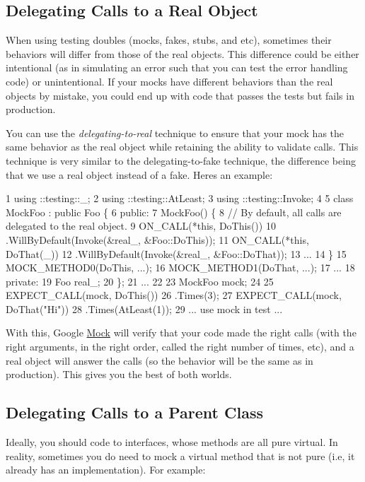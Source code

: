 \subsection*{Delegating Calls to a Real Object}

When using testing doubles (mocks, fakes, stubs, and etc), sometimes their behaviors will differ from those of the real objects. This difference could be either intentional (as in simulating an error such that you can test the error handling code) or unintentional. If your mocks have different behaviors than the real objects by mistake, you could end up with code that passes the tests but fails in production.

You can use the {\itshape delegating-\/to-\/real} technique to ensure that your mock has the same behavior as the real object while retaining the ability to validate calls. This technique is very similar to the delegating-\/to-\/fake technique, the difference being that we use a real object instead of a fake. Here\textquotesingle{}s an example\+:


\begin{DoxyCode}
1 using ::testing::\_;
2 using ::testing::AtLeast;
3 using ::testing::Invoke;
4 
5 class MockFoo : public Foo \{
6  public:
7   MockFoo() \{
8     // By default, all calls are delegated to the real object.
9     ON\_CALL(*this, DoThis())
10         .WillByDefault(Invoke(&real\_, &Foo::DoThis));
11     ON\_CALL(*this, DoThat(\_))
12         .WillByDefault(Invoke(&real\_, &Foo::DoThat));
13     ...
14   \}
15   MOCK\_METHOD0(DoThis, ...);
16   MOCK\_METHOD1(DoThat, ...);
17   ...
18  private:
19   Foo real\_;
20 \};
21 ...
22 
23   MockFoo mock;
24 
25   EXPECT\_CALL(mock, DoThis())
26       .Times(3);
27   EXPECT\_CALL(mock, DoThat("Hi"))
28       .Times(AtLeast(1));
29   ... use mock in test ...
\end{DoxyCode}


With this, Google \hyperlink{classMock}{Mock} will verify that your code made the right calls (with the right arguments, in the right order, called the right number of times, etc), and a real object will answer the calls (so the behavior will be the same as in production). This gives you the best of both worlds.

\subsection*{Delegating Calls to a Parent Class}

Ideally, you should code to interfaces, whose methods are all pure virtual. In reality, sometimes you do need to mock a virtual method that is not pure (i.\+e, it already has an implementation). For example\+:


